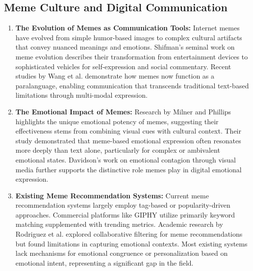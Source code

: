 \documentclass[conference]{IEEEtran}
\begin{document}
\subsection{Meme Culture and Digital Communication}
\begin{enumerate}
    \item \textbf{The Evolution of Memes as Communication Tools:} Internet memes have evolved from simple humor-based images to complex cultural artifacts that convey nuanced meanings and emotions. Shifman’s seminal work on meme evolution describes their transformation from entertainment devices to sophisticated vehicles for self-expression and social commentary. Recent studies by Wang et al. demonstrate how memes now function as a paralanguage, enabling communication that transcends traditional text-based limitations through multi-modal expression.
    \item \textbf{The Emotional Impact of Memes:} Research by Milner and Phillips highlights the unique emotional potency of memes, suggesting their effectiveness stems from combining visual cues with cultural context. Their study demonstrated that meme-based emotional expression often resonates more deeply than text alone, particularly for complex or ambivalent emotional states. Davidson’s work on emotional contagion through visual media further supports the distinctive role memes play in digital emotional expression.
    \item \textbf{Existing Meme Recommendation Systems:} Current meme recommendation systems largely employ tag-based or popularity-driven approaches. Commercial platforms like GIPHY utilize primarily keyword matching supplemented with trending metrics. Academic research by Rodriguez et al. explored collaborative filtering for meme recommendations but found limitations in capturing emotional contexts. Most existing systems lack mechanisms for emotional congruence or personalization based on emotional intent, representing a significant gap in the field.
\end{enumerate}
\end{document}
